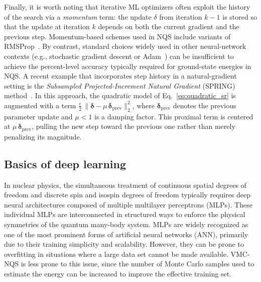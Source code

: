 Finally, it is worth noting that iterative ML optimizers often exploit the history of the search via a \emph{momentum} term: the update $\delta$ from iteration $k\!-\!1$ is stored so that the update at iteration $k$ depends on both the current gradient and the previous step. Momentum-based schemes used in NQS include variants of RMSProp~\cite{park_geometry_2020,keeble_machine_2020}. By contrast, standard choices widely used in other neural-network contexts (e.g., stochastic gradient descent or Adam~\cite{kingma_adam_2014}) can be insufficient to achieve the percent-level accuracy typically required for ground-state energies in NQS.
A recent example that incorporates step history in a natural-gradient setting is the \emph{Subsampled Projected-Increment Natural Gradient} (SPRING) method~\cite{goldshlager_kaczmarz-inspired_2024}. In this approach, the quadratic model of Eq.~\eqref{eq:quadratic_sr} is augmented with a term $\tfrac{\epsilon}{2}\,\|\boldsymbol{\delta} - \mu\,\boldsymbol{\delta}_{\mathrm{prev}}\|_2^{2}$, where $\boldsymbol{\delta}_{\mathrm{prev}}$ denotes the previous parameter update and $\mu<1$ is a damping factor. This proximal term is centered at $\mu\,\boldsymbol{\delta}_{\mathrm{prev}}$, pulling the new step toward the previous one rather than merely penalizing its magnitude.







\subsection{Basics of deep learning}
\label{sec:deep_learning}
In nuclear physics, the simultaneous treatment of continuous spatial degrees of freedom and discrete spin and isospin degrees of freedom typically requires deep neural architectures composed of multiple multilayer perceptrons (MLPs). These individual MLPs are interconnected in structured ways to enforce the physical symmetries of the quantum many-body system. MLPs are widely recognized as one of the most prominent forms of artificial neural networks (ANN), primarily due to their training simplicity and scalability. However, they can be prone to overfitting in situations where a large data set cannot be made available. VMC-NQS is less prone to this issue, since the number of Monte Carlo samples used to estimate the energy can be increased to improve the effective training set.

